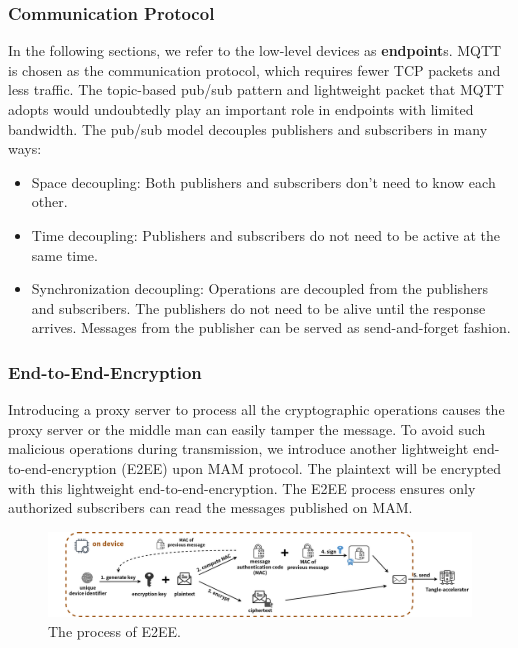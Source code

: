 \begin{spacing}{2.0}
\subsubsection{Communication Protocol}
In the following sections, we refer to the low-level devices as \textbf{endpoint}s. MQTT\cite{MQTT} is chosen as the communication protocol, which requires fewer TCP packets and less traffic. The topic-based pub/sub pattern and lightweight packet that MQTT adopts would undoubtedly play an important role in endpoints with limited bandwidth. The pub/sub model decouples publishers and subscribers in many ways:

\begin{itemize}
    \item Space decoupling: Both publishers and subscribers don't need to know each other.
    \item Time decoupling: Publishers and subscribers do not need to be active at the same time.
    \item Synchronization decoupling: Operations are decoupled from the publishers and subscribers. The publishers do not need to be alive until the response arrives. Messages from the publisher can be served as send-and-forget fashion.
\end{itemize}

\subsubsection{End-to-End-Encryption}
Introducing a proxy server to process all the cryptographic operations causes the proxy server or the middle man can easily tamper the message. To avoid such malicious operations during transmission, we introduce another lightweight end-to-end-encryption (E2EE) upon MAM protocol. The plaintext will be encrypted with this lightweight end-to-end-encryption. The E2EE process ensures only authorized subscribers can read the messages published on MAM.

\begin{figure}[h]
    \centering
    \includegraphics[width=\linewidth]{img/MAM_E2EE}
    \caption{The process of E2EE.}
    \label{fig:MAM_E2EE}
\end{figure}


\end{spacing}
